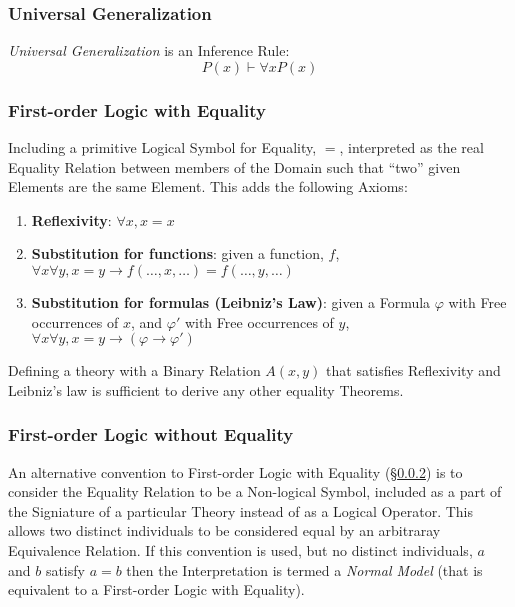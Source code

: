 \subsubsection{Universal Generalization}\label{sec:universal_generalization}

\emph{Universal Generalization} is an Inference Rule:
\[P(x) \vdash \forall x P(x)\]



\subsubsection{First-order Logic with Equality}\label{sec:firstorder_equality}

Including a primitive Logical Symbol for Equality, $=$, interpreted
as the real Equality Relation between members of the Domain such that
``two'' given Elements are the same Element. This adds the following
Axioms:

\begin{enumerate}
\item \textbf{Reflexivity}: $\forall x, x=x$
\item \textbf{Substitution for functions}: given a function, $f$,
  $\forall x \forall y, x = y \rightarrow f(\ldots,x,\ldots) =
  f(\ldots,y,\ldots)$
\item \textbf{Substitution for formulas (Leibniz's Law)}: given a
  Formula $\varphi$ with Free occurrences of $x$, and $\varphi '$ with
  Free occurrences of $y$, $\forall x \forall y, x = y \rightarrow
  (\varphi \rightarrow \varphi ')$
\end{enumerate}

Defining a theory with a Binary Relation $A(x,y)$ that satisfies
Reflexivity and Leibniz's law is sufficient to derive any other
equality Theorems.



\subsubsection{First-order Logic without Equality}
\label{sec:firstorder_no_equality}

An alternative convention to First-order Logic with Equality
(\S\ref{sec:firstorder_equality}) is to consider the Equality Relation
to be a Non-logical Symbol, included as a part of the Signiature of a
particular Theory instead of as a Logical Operator. This allows two
distinct individuals to be considered equal by an arbitraray
Equivalence Relation. If this convention is used, but no distinct
individuals, $a$ and $b$ satisfy $a=b$ then the Interpretation is
termed a \emph{Normal Model} (that is equivalent to a First-order
Logic with Equality).



